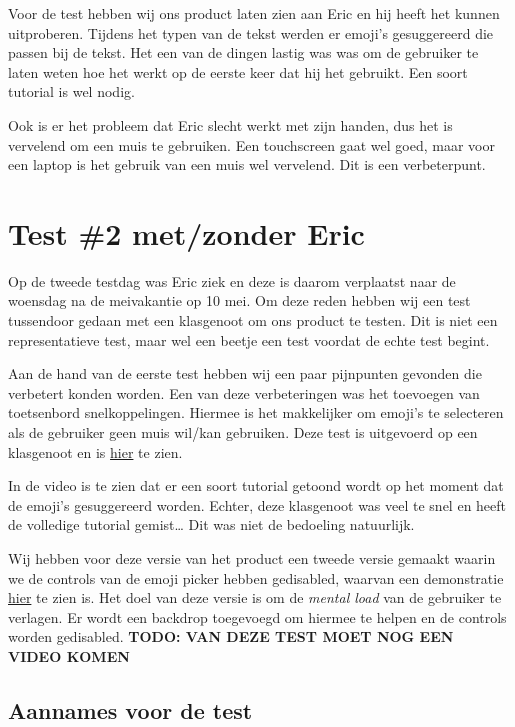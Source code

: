 \documentclass[12pt]{article}
\begin{document}
Voor de test hebben wij ons product laten zien aan Eric en hij heeft het kunnen uitproberen.
Tijdens het typen van de tekst werden er emoji's gesuggereerd die passen bij de tekst.
Het een van de dingen lastig was was om de gebruiker te laten weten hoe het werkt op de eerste keer dat hij het gebruikt.
Een soort tutorial is wel nodig.

Ook is er het probleem dat Eric slecht werkt met zijn handen, dus het is vervelend om een muis te gebruiken.
Een touchscreen gaat wel goed, maar voor een laptop is het gebruik van een muis wel vervelend.
Dit is een verbeterpunt.

\clearpage\section{Test \#2 met/zonder Eric}

Op de tweede testdag was Eric ziek en deze is daarom verplaatst naar de woensdag na de meivakantie op 10 mei.
Om deze reden hebben wij een test tussendoor gedaan met een klasgenoot om ons product te testen.
Dit is niet een representatieve test, maar wel een beetje een test voordat de echte test begint.

Aan de hand van de eerste test hebben wij een paar pijnpunten gevonden die verbetert konden worden.
Een van deze verbeteringen was het toevoegen van toetsenbord snelkoppelingen.
Hiermee is het makkelijker om emoji's te selecteren als de gebruiker geen muis wil/kan gebruiken.
Deze test is uitgevoerd op een klasgenoot en is \href{https://cdn.nicecock.eu/hcd/hcd/Attachments/kb-shortcut-test-ting.mp4}{hier} te zien.

In de video is te zien dat er een soort tutorial getoond wordt op het moment dat de emoji's gesuggereerd worden.
Echter, deze klasgenoot was veel te snel en heeft de volledige tutorial gemist\dots
Dit was niet de bedoeling natuurlijk.

Wij hebben voor deze versie van het product een tweede versie gemaakt waarin we de controls van de emoji picker hebben gedisabled, waarvan een demonstratie \href{https://cdn.nicecock.eu/hcd/hcd/Attachments/kb-shortcuts-disable-ui.mov}{hier} te zien is.
Het doel van deze versie is om de \textit{mental load} van de gebruiker te verlagen.
Er wordt een backdrop toegevoegd om hiermee te helpen en de controls worden gedisabled.
\colorbox{red!30}{\textbf{TODO: VAN DEZE TEST MOET NOG EEN VIDEO KOMEN}}

\subsection{Aannames voor de test}
\end{document}

